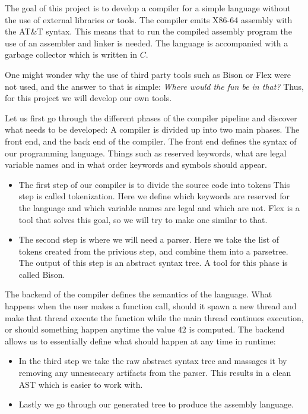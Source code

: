 The goal of this project is to develop a compiler for a simple language without the use of external libraries or tools. The compiler emits X86-64 assembly with the AT\&T syntax. This means that to run the compiled assembly program the use of an assembler and linker is needed. The language is accompanied with a garbage collector which is written in $C$. 

One might wonder why the use of third party tools such as Bison or Flex were not used, and the answer to that is simple: \textit{Where would the fun be in that?} Thus, for this project we will develop our own tools. 

Let us first go through the different phases of the compiler pipeline and discover what needs to be developed:
A compiler is divided up into two main phases. The front end, and the back end of the compiler. The front end defines the syntax of our programming language. Things such as reserved keywords, what are legal variable names and in what order keywords and symbols should appear. 
\begin{itemize}
    \item The first step of our compiler is to divide the source code into tokens This step is called tokenization. Here we define which keywords are reserved for the language and which variable names are legal and which are not. Flex is a tool that solves this goal, so we will try to make one similar to that.
    \item The second step is where we will need a parser. Here we take the list of tokens created from the privious step, and combine them into a parsetree. The output of this step is an abstract syntax tree. A tool for this phase is called Bison.
\end{itemize}  

The backend of the compiler defines the semantics of the language. What happens when the user makes a function call, should it spawn a new thread and make that thread execute the function while the main thread continues execution, or should something happen anytime the value $42$ is computed. The backend allows us to essentially define what should happen at any time in runtime:
\begin{itemize}
  \item In the third step we take the raw abstract syntax tree and massages it by removing any unnessecary artifacts from the parser. This results in a clean AST which is easier to work with.
  \item Lastly we go through our generated tree to produce the assembly language.
\end{itemize}
